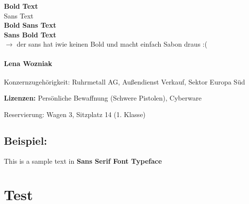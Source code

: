 \textbf{Bold Text} \\

\textsf{Sans Text} \\

\textbf{\textsf{Bold Sans Text}} \\

\textsf{\textbf{Sans Bold Text}} \\

$\rightarrow$ der sans hat iwie keinen Bold und macht einfach Sabon draus :(

\begin{tcolorbox}[enhanced jigsaw,
                  colback   = graybox,
                  colframe  = grayframe, 
                  opacityback = 0.2,
                  arc = 10pt,
                  fuzzy halo = 1.5mm with grayframe,
                  fontupper = \sffamily\normalsize]
    \paragraph{Lena Wozniak}
    
    \textsf{Konzernzugehörigkeit:} Ruhrmetall AG, Außendienst Verkauf, Sektor Europa Süd
    
    \textbf{Lizenzen:} Persönliche Bewaffnung (Schwere Pistolen), Cyberware
    
    \textsf{Reservierung:} Wagen 3, Sitzplatz 14 (1. Klasse) 
\end{tcolorbox}

\subsection{Beispiel:}

{\sffamily This is a sample text in \textbf{Sans Serif Font Typeface}}






\section{Test}

